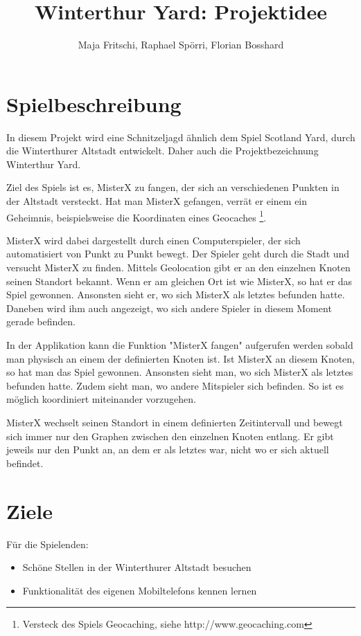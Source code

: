 \documentclass[11pt]{article}
\title{Winterthur Yard: Projektidee}
\author{Maja Fritschi, Raphael Spörri, Florian Bosshard}
\date{}
\begin{document}
\maketitle

\tableofcontents
\newpage

\section{Spielbeschreibung}
In diesem Projekt wird eine Schnitzeljagd ähnlich dem Spiel Scotland Yard, durch die Winterthurer Altstadt entwickelt. Daher auch die Projektbezeichnung Winterthur Yard. 

Ziel des Spiels ist es, MisterX zu fangen, der sich an verschiedenen Punkten in der Altstadt versteckt. Hat man MisterX gefangen, verrät er einem ein Geheimnis, beispielsweise die Koordinaten eines Geocaches \footnote{Versteck des Spiels Geocaching, siehe http://www.geocaching.com}. 

MisterX wird dabei dargestellt durch einen Computerspieler, der sich automatisiert von Punkt zu Punkt bewegt. Der Spieler geht durch die Stadt und versucht MisterX zu finden. Mittels Geolocation gibt er an den einzelnen Knoten seinen Standort bekannt. Wenn er am gleichen Ort ist wie MisterX, so hat er das Spiel gewonnen. Ansonsten sieht er, wo sich MisterX als letztes befunden hatte. Daneben wird ihm auch angezeigt, wo sich andere Spieler in diesem Moment gerade befinden. 

In der Applikation kann die Funktion "MisterX fangen" aufgerufen werden sobald man physisch an einem der definierten Knoten ist. Ist MisterX an diesem Knoten, so hat man das Spiel gewonnen. Ansonsten sieht man, wo sich MisterX als letztes befunden hatte. Zudem sieht man, wo andere Mitspieler sich befinden. So ist es möglich koordiniert miteinander vorzugehen. 

MisterX wechselt seinen Standort in einem definierten Zeitintervall und bewegt sich immer nur den Graphen zwischen den einzelnen Knoten entlang. Er gibt jeweils nur den Punkt an, an dem er als letztes war, nicht wo er sich aktuell befindet. 

\section{Ziele}
Für die Spielenden:
\begin{itemize}
\item Schöne Stellen in der Winterthurer Altstadt besuchen
\item Funktionalität des eigenen Mobiltelefons kennen lernen
\end{itemize}
\end{document}
